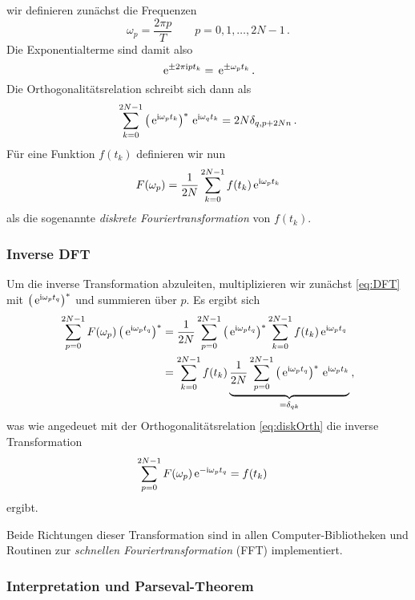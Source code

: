 \documentclass[paper=a4, fontsize=11.0pt, abstractoff, DIV12]{scrartcl}
\begin{document}
wir definieren zunächst die Frequenzen
\begin{equation}
\omega_p = \frac{2\pi p }{T}\qquad p=0,1,\dots,2N-1\,.
\end{equation}
Die Exponentialterme sind damit also
\begin{equation*}
\,{\mathrm{e}}^{\pm 2\pi\mathrm{i} pt_k} = \,{\mathrm{e}}^{\pm \omega_p t_k}\,.
\end{equation*}
Die Orthogonalitätsrelation schreibt sich dann als
\begin{equation}
\sum\limits_{k=0}^{2N-1} \left(\,{\mathrm{e}}^{\mathrm{i} \omega_p t_k}\right)^* \,{\mathrm{e}}^{\mathrm{i} \omega_q t_k} = 2N\delta_{q,p+2Nn}\,.
\end{equation}
Für eine Funktion $f(t_k)$ definieren wir nun
\begin{equation}
F(\omega_p) = \frac{1}{2N}\sum\limits_{k=0}^{2N-1}f(t_k)\,{\mathrm{e}}^{\mathrm{i}\omega_pt_k}
\label{eq:DFT}
\end{equation}
als die sogenannte \emph{diskrete Fouriertransformation} von $f(t_k)$.

\subsubsection{Inverse DFT}

Um die inverse Transformation abzuleiten, multiplizieren wir zunächst \eqref{eq:DFT}
mit $\left(\,{\mathrm{e}}^{\mathrm{i}\omega_p t_q}\right)^*$ und summieren über $p$. Es ergibt sich
\begin{align}
\sum\limits_{p=0}^{2N-1}F(\omega_p)\left(\,{\mathrm{e}}^{\mathrm{i}\omega_p t_q}\right)^* &= \frac{1}{2N} \sum\limits_{p=0}^{2N-1} \left(\,{\mathrm{e}}^{\mathrm{i}\omega_p t_q}\right)^* \sum\limits_{k=0}^{2N-1}f(t_k) \,{\mathrm{e}}^{\mathrm{i}\omega_p t_q}\nonumber\\
&=\sum\limits_{k=0}^{2N-1}f(t_k) \underbrace{\frac{1}{2N}\sum\limits_{p=0}^{2N-1}\left(\,{\mathrm{e}}^{\mathrm{i}\omega_p t_q}\right)^*\,{\mathrm{e}}^{\mathrm{i}\omega_p t_k} }_{=\delta_{qk}}\,,
\end{align}
was wie angedeuet mit der Orthogonalitätsrelation \eqref{eq:diskOrth} die inverse Transformation
\begin{align}
\sum\limits_{p=0}^{2N-1}F(\omega_p)\,{\mathrm{e}}^{-\mathrm{i}\omega_p t_q} &= f(t_k)
\end{align}
ergibt.

Beide Richtungen dieser Transformation sind in allen Computer-Bibliotheken
und Routinen zur \emph{schnellen Fouriertransformation} (FFT) implementiert.

\subsubsection{Interpretation und Parseval-Theorem}
\end{document}
